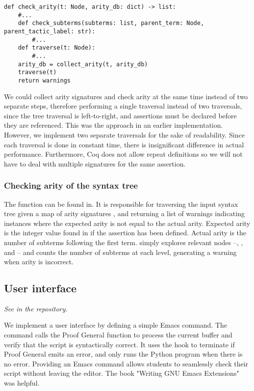 \begin{verbatim}
def check_arity(t: Node, arity_db: dict) -> list:
    #...
    def check_subterms(subterms: list, parent_term: Node, parent_tactic_label: str):
        #...
    def traverse(t: Node):
        #...
    arity_db = collect_arity(t, arity_db)
    traverse(t)
    return warnings
\end{verbatim}
We could collect arity signatures and check arity at the same time instead of two separate steps, therefore performing a single traversal instead of two traversals, since the tree traversal is left-to-right, and assertions must be declared before they are referenced. This was the approach in an earlier implementation. However, we implement two separate traversals for the sake of readability. Since each traversal is done in constant time, there is insignificant difference in actual performance. Furthermore, Coq does not allow repeat definitions so we will not have to deal with multiple signatures for the same assertion.

\subsubsection{Checking arity of the syntax tree}
The  function can be found in. It is responsible for traversing the input syntax tree  given a map of arity signatures , and returning a list of warnings indicating instances where the expected arity is not equal to the actual arity. Expected arity is the integer value found in  if the assertion has been defined. Actual arity is the number of subterms following the first term.  simply explores relevant nodes –, , and  – and counts the number of subterms at each level, generating a warning when arity is incorrect.

\subsection{User interface}
\emph{See  in the repository.}

We implement a user interface by defining a simple Emacs command. The command calls the Proof General function  to process the current buffer and verify that the script is syntactically correct. It uses the hook  to terminate if Proof General emits an error, and only runs the Python program when there is no error. Providing an Emacs command allows students to seamlessly check their script without leaving the editor. The book "Writing GNU Emacs Extensions" \parencite{glickstein} was helpful.

